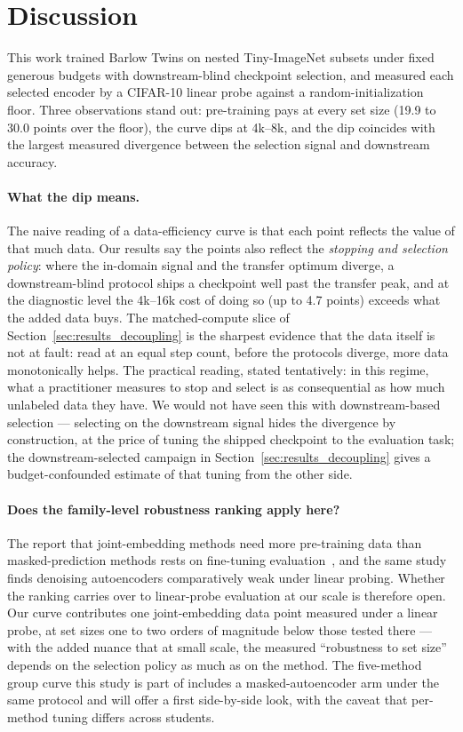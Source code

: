 \section{Discussion}
\label{sec:discussion}

This work trained Barlow Twins on nested Tiny-ImageNet subsets under fixed
generous budgets with downstream-blind checkpoint selection, and measured
each selected encoder by a CIFAR-10 linear probe against a
random-initialization floor. Three observations stand out: pre-training
pays at every set size (19.9 to 30.0 points over the floor), the curve dips
at 4k--8k, and the dip coincides with the largest measured divergence
between the selection signal and downstream accuracy.

\paragraph{What the dip means.}
The naive reading of a data-efficiency curve is that each point reflects
the value of that much data. Our results say the points also reflect the
\emph{stopping and selection policy}: where the in-domain signal and the
transfer optimum diverge, a downstream-blind protocol ships a checkpoint
well past the transfer peak, and at the diagnostic level the 4k--16k cost
of doing so (up to 4.7 points) exceeds what the added data buys. The
matched-compute slice of Section~\ref{sec:results_decoupling} is the
sharpest evidence that the data itself is not at fault: read at an equal
step count, before the protocols diverge, more data monotonically helps. The practical reading, stated
tentatively: in this regime, what a practitioner measures to stop and
select is as consequential as how much unlabeled data they have. We would
not have seen this with downstream-based selection --- selecting on the
downstream signal hides the divergence by construction, at the price of
tuning the shipped checkpoint to the evaluation task; the
downstream-selected campaign in Section~\ref{sec:results_decoupling} gives
a budget-confounded estimate of that tuning from the other side.

\paragraph{Does the family-level robustness ranking apply here?}
The report that joint-embedding methods need more pre-training data than
masked-prediction methods rests on fine-tuning
evaluation~\cite{elnouby2021largescale}, and the same study finds denoising
autoencoders comparatively weak under linear probing. Whether the ranking
carries over to linear-probe evaluation at our scale is therefore open. Our
curve contributes one joint-embedding data point measured under a linear
probe, at set sizes one to two orders of magnitude below those tested
there --- with the added nuance that at small scale, the measured
``robustness to set size'' depends on the selection policy as much as on
the method. The five-method group curve this study is part of includes a
masked-autoencoder arm under the same protocol and will offer a first
side-by-side look, with the caveat that per-method tuning differs across
students.

